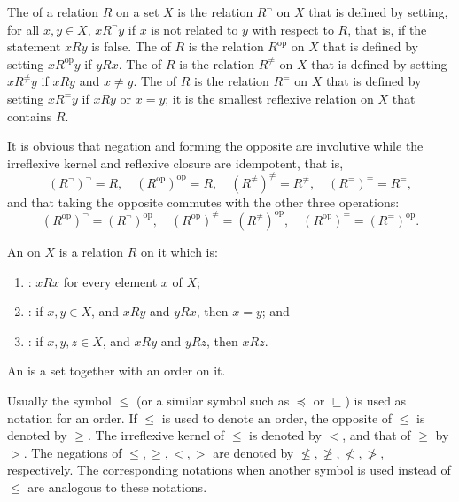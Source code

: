 \documentclass{article}
\begin{document}
The  of a relation \(R\) on a set \(X\) is the
relation \(R^\neg\) on \(X\) that is defined by setting, for all
\(x, y \in X\), \(x R^\neg y\) if \(x\) is not related to \(y\) with
respect to \(R\), that is, if the statement \(x R y\) is false.  The
 of \(R\) is the relation \(R^{\mathrm{op}}\) on
\(X\) that is defined by setting \(x R^{\mathrm{op}} y\) if \(y R x\).
The  of \(R\) is the relation \(R^\neq\)
on \(X\) that is defined by setting \(x R^\neq y\) if \(x R y\) and
\(x \neq y\).  The  of \(R\) is the
relation \(R^=\) on \(X\) that is defined by setting \(x R^= y\) if
\(x R y\) or \(x = y\); it is the smallest reflexive relation on \(X\)
that contains \(R\).

It is obvious that negation and forming the opposite are involutive
while the irreflexive kernel and reflexive closure are idempotent,
that is,
\begin{displaymath}
  (R^\neg)^\neg = R, \quad
  (R^{\mathrm{op}})^{\mathrm{op}} = R, \quad
  (R^\neq)^\neq = R^\neq, \quad
  (R^=)^= = R^=,
\end{displaymath}
and that taking the opposite commutes with the other three operations:
\begin{displaymath}
  (R^{\mathrm{op}})^\neg = (R^\neg)^{\mathrm{op}}, \quad
  (R^{\mathrm{op}})^\neq = (R^\neq)^{\mathrm{op}}, \quad
  (R^{\mathrm{op}})^= = (R^=)^{\mathrm{op}}.
\end{displaymath}

An  on \(X\) is a relation \(R\) on it which is:
\begin{enumerate}
\item {}: \(x R x\) for every element \(x\) of
  \(X\);
\item {}: if \(x, y \in X\), and \(x R y\) and
\(y R x\), then \(x = y\); and
\item {}: if \(x, y, z \in X\), and \(x R y\) and
  \(y R z\), then \(x R z\).
\end{enumerate}
An  is a set together with an order on it.

Usually the symbol \(\leq\) (or a similar symbol such as \(\preceq\)
or \(\sqsubseteq\)) is used as notation for an order.  If \(\leq\) is
used to denote an order, the opposite of \(\leq\) is denoted by
\(\geq\).  The irreflexive kernel of \(\leq\) is denoted by \(<\), and
that of \(\geq\) by \(>\).  The negations of \(\leq, \geq, <, >\) are
denoted by \(\nleq, \ngeq, \nless, \ngtr\), respectively.  The
corresponding notations when another symbol is used instead of
\(\leq\) are analogous to these notations.
\end{document}

